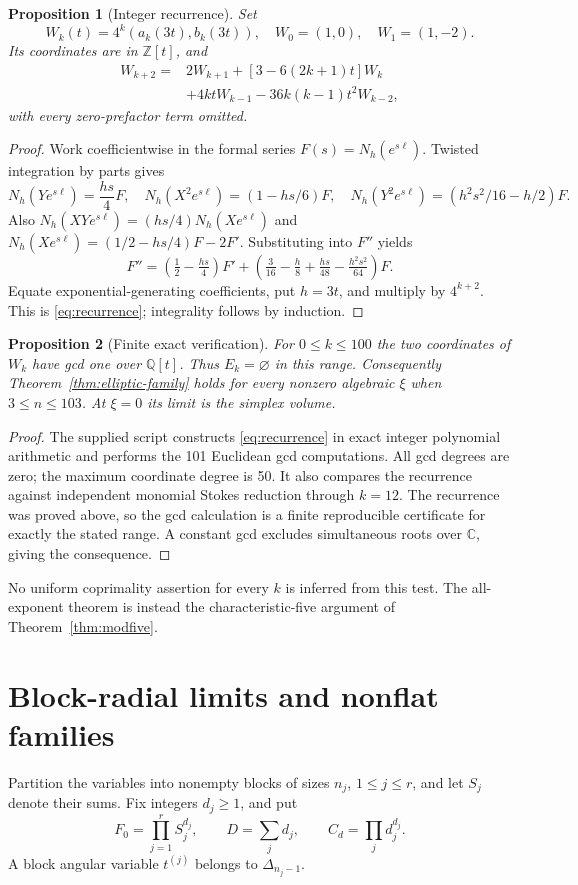 \documentclass[11pt]{article}
\numberwithin{equation}{section}
\newtheorem{proposition}[proposition]{Proposition}
\theoremstyle{definition}
\theoremstyle{remark}
\newcommand{\C}{\mathbb C}
\newcommand{\Q}{\mathbb Q}
\newcommand{\Z}{\mathbb Z}
\begin{document}
\begin{proposition}[Integer recurrence]\label{prop:recurrence}
Set
\[
 W_k(t)=4^k(a_k(3t),b_k(3t)),\quad W_0=(1,0),\quad W_1=(1,-2).
\]
Its coordinates are in $\Z[t]$, and
\begin{align}\label{eq:recurrence}
 W_{k+2}={}&2W_{k+1}+[3-6(2k+1)t]W_k\\
 &+4ktW_{k-1}-36k(k-1)t^2W_{k-2},\nonumber
\end{align}
with every zero-prefactor term omitted.
\end{proposition}
\begin{proof}
Work coefficientwise in the formal series
$F(s)=N_h(e^{s\ell})$. Twisted integration by parts gives
\[
 N_h(Ye^{s\ell})=\frac{hs}{4}F,\quad
 N_h(X^2e^{s\ell})=(1-hs/6)F,\quad
 N_h(Y^2e^{s\ell})=(h^2s^2/16-h/2)F.
\]
Also $N_h(XYe^{s\ell})=(hs/4)N_h(Xe^{s\ell})$ and
$N_h(Xe^{s\ell})=(1/2-hs/4)F-2F'$. Substituting into $F''$ yields
\[
 F''=(\tfrac12-\tfrac{hs}{4})F'
 +(\tfrac3{16}-\tfrac h8+\tfrac{hs}{48}-\tfrac{h^2s^2}{64})F.
\]
Equate exponential-generating coefficients, put $h=3t$, and multiply by
$4^{k+2}$. This is \eqref{eq:recurrence}; integrality follows by induction.
\end{proof}

\begin{proposition}[Finite exact verification]\label{prop:finite}
For $0\le k\le100$ the two coordinates of $W_k$ have gcd one over $\Q[t]$.
Thus $E_k=\varnothing$ in this range. Consequently
Theorem~\ref{thm:elliptic-family} holds for every nonzero algebraic $\xi$
when $3\le n\le103$. At $\xi=0$ its limit is the simplex volume.
\end{proposition}
\begin{proof}
The supplied script constructs \eqref{eq:recurrence} in exact integer
polynomial arithmetic and performs the 101 Euclidean gcd computations.
All gcd degrees are zero; the maximum coordinate degree is 50. It also
compares the recurrence against independent monomial Stokes reduction
through $k=12$. The recurrence was proved above, so the gcd calculation is
a finite reproducible certificate for exactly the stated range. A constant
gcd excludes simultaneous roots over $\C$, giving the consequence.
\end{proof}

No uniform coprimality assertion for every $k$ is inferred from this test.
The all-exponent theorem is instead the characteristic-five argument of
Theorem~\ref{thm:modfive}.

\section{Block-radial limits and nonflat families}
Partition the variables into nonempty blocks of sizes $n_j$, $1\le j\le r$,
and let $S_j$ denote their sums. Fix integers $d_j\ge1$, and put
\[
 F_0=\prod_{j=1}^r S_j^{d_j},\qquad D=\sum_jd_j,\qquad
 C_d=\prod_jd_j^{d_j}.
\]
A block angular variable $t^{(j)}$ belongs to $\Delta_{n_j-1}$.
\end{document}

